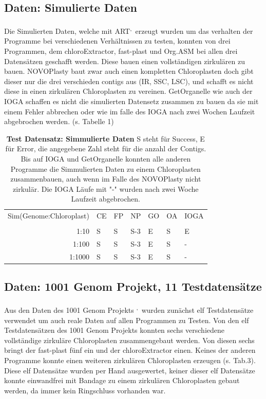 \documentclass{scrartcl}
\begin{document}
\subsection{Daten: Simulierte Daten}
\label{sec-4-2}
Die Simulierten Daten, welche mit ART\footnotemark[38]{}\textsuperscript{,}\,\footnotemark[39]{} erzeugt wurden um das verhalten der Programme bei verschiedenen Verhältnissen zu testen, konnten von drei Programmen, dem chloroExtractor, fast-plast und Org.ASM 
bei allen drei Datensätzen geschafft werden. Diese bauen einen vollständigen zirkulären zu bauen. NOVOPlasty baut zwar auch einen kompletten Chloroplasten doch gibt dieser 
nur die drei verschieden contigs aus (IR, SSC, LSC), und schafft es nicht diese in einen zirkulären Chloroplasten zu vereinen. GetOrganelle wie auch der IOGA schaffen es nicht die
simulierten Datensetz zusammen zu bauen da sie mit einem Fehler abbrechen oder wie im falle des IOGA nach zwei Wochen Laufzeit abgebrochen werden. (s. Tabelle 1) 

\begin{table}[!h]
\caption[Test Datensatz: Simmulierte Daten]{\textbf{Test Datensatz: Simmulierte Daten} S steht für Success, E für Error, die angegebene Zahl steht für die anzahl der Contigs. Bis auf IOGA und GetOrganelle konnten alle anderen Programme die Simmulierten Daten zu einem Chloroplasten zusammenbauen, auch wenn im Falle des NOVOPlasty nicht zirkulär. Die IOGA Läufe mit "-" wurden nach zwei Woche Laufzeit abgebrochen.}
\begin{center}
\begin{tabular}{rllllll}
Sim(Genome:Chloroplast) & CE & FP & NP & GO & OA & IOGA\\
 &  &  &  &  &  & \\
\hline
1:10 & S & S & S-3 & E & S & E\\
1:100 & S & S & S-3 & E & S & -\\
1:1000 & S & S & S-3 & E & S & -\\
\end{tabular}
\end{center}
\end{table}

\subsection{Daten: 1001 Genom Projekt, 11 Testdatensätze}
\label{sec-4-3}
Aus den Daten des 1001 Genom Projekts \footnotemark[32]{}\textsuperscript{,}\,\footnotemark[33]{} wurden zunächst elf Testdatensätze verwendet um auch reale Daten auf allen Programmen zu Testen.
Von den elf Testdatensätzen des 1001 Genom Projekts konnten sechs verschiedene vollständige zirkuläre Chloroplasten zusammengebaut werden. Von diesen
sechs bringt der fast-plast fünf ein und der chloroExtractor einen. Keines der anderen Programme konnte einen weiteren 
zirkulären Chloroplasten erzeugen (s. Tab.3). Diese elf Datensätze wurden per Hand ausgewertet, keiner dieser elf Datensätze konnte einwandfrei mit Bandage
zu einem zirkulären Chloroplasten gebaut werden, da immer kein Ringschluss vorhanden war.
\end{document}
